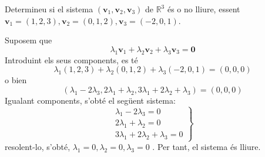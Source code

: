 \begin{exemple}
Determineu si el sistema $(\mathbf{v}_{1},\mathbf{v}_{2},\mathbf{v}_{3})$ de 
$\mathbb{R}^{3}$ és o no lliure, essent $\mathbf{v}_{1}=(1,2,3),\mathbf{v}%
_{2}=(0,1,2),\mathbf{v}_{3}=(-2,0,1)$.

\end{exemple}
\begin{solucio}
Suposem que%
\begin{equation*}
\lambda _{1}\mathbf{v}_{1}+\lambda _{2}\mathbf{v}_{2}+\lambda _{3}\mathbf{v}%
_{3}=\mathbf{0}
\end{equation*}%
Introduint els seus components, es té%
\begin{equation*}
\lambda _{1}(1,2,3)+\lambda _{2}(0,1,2)+\lambda _{3}(-2,0,1)=(0,0,0)
\end{equation*}%
o bien%
\begin{equation*}
(\lambda _{1}-2\lambda _{3},2\lambda _{1}+\lambda _{2},3\lambda
_{1}+2\lambda _{2}+\lambda _{3})=(0,0,0)
\end{equation*}%
Igualant components, s’obté el següent sistema:%
\begin{equation*}
\left. 
\begin{array}{r}
\lambda _{1}-2\lambda _{3}=0 \\ 
2\lambda _{1}+\lambda _{2}=0 \\ 
3\lambda _{1}+2\lambda _{2}+\lambda _{3}=0%
\end{array}%
\right\}
\end{equation*}%
resolent-lo, s’obté, $\lambda _{1}=0,\lambda _{2}=0,\lambda _{3}=0$%
. Per tant, el sistema és lliure.
\end{solucio}

